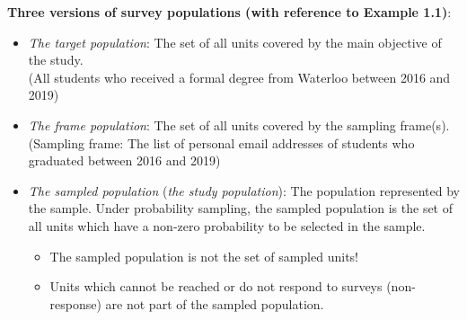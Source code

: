 \textbf{Three versions of survey populations (with reference to Example 1.1)}:
\begin{itemize}
      \item \emph{The target population}: The set of all units covered by the main
            objective of the study.\\
            (All students who received a formal degree from Waterloo
            between 2016 and 2019)
      \item \emph{The frame population}: The set of all units covered by the
            sampling frame(s).\\
            (Sampling frame: The list of personal email addresses of
            students who graduated between 2016 and 2019)
      \item \emph{The sampled population} (\emph{the study population}):
            The population represented by the sample. Under probability sampling, the
            sampled population is the set of all units which have a non-zero
            probability to be selected in the sample.
            \begin{itemize}
                  \item The sampled population is not the set of sampled units!
                  \item Units which cannot be reached or do not respond to surveys
                        (non-response) are not part of the sampled population.
            \end{itemize}
\end{itemize}


